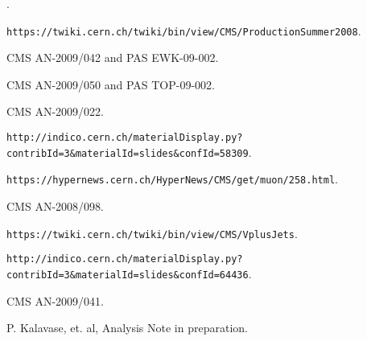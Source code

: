 \begin{thebibliography}{99}

.

 {\tt https://twiki.cern.ch/twiki/bin/view/CMS/ProductionSummer2008}.

 CMS AN-2009/042 and PAS EWK-09-002.

 CMS AN-2009/050 and PAS TOP-09-002.

 CMS AN-2009/022.

 {\tt http://indico.cern.ch/materialDisplay.py?contribId=3\&materialId=slides\&confId=58309}.

 {\tt https://hypernews.cern.ch/HyperNews/CMS/get/muon/258.html}.

 CMS AN-2008/098.

 {\tt https://twiki.cern.ch/twiki/bin/view/CMS/VplusJets}.

 {\tt http://indico.cern.ch/materialDisplay.py?contribId=3\&materialId=slides\&confId=64436}.

 CMS AN-2009/041.

 P. Kalavase, et. al, Analysis Note in preparation.

\end{thebibliography}








